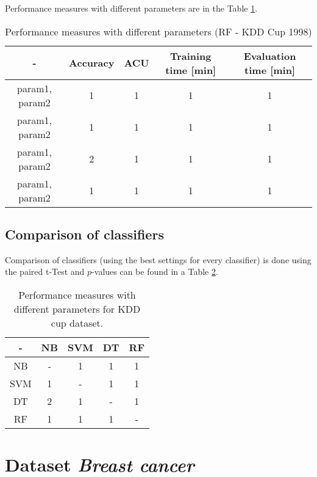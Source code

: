 \documentclass[11pt,a4paper,titlepage]{article}
\begin{document}
  Performance measures with different parameters are in the Table \ref{table:RFKDD}.
  
  \begin{table}
  \centering
  \begin{tabular}{| c | c | c | c | c |}
    \hline
     		-	   & Accuracy & 	ACU 	& Training time [min] & Evaluation time [min] \\ \hline
    param1, param2 &  1 	  &     1		& 		1			  & 		1 		\\ \hline
    param1, param2 & 	1	  & 	1 		& 		1			  &			1 		\\ \hline
    param1, param2 & 	2	  & 	1		& 		1			  &			1		\\ \hline
    param1, param2 &  1       & 	1		& 		1			  &			1			\\
    \hline
  \end{tabular}
  \caption{Performance measures with different parameters (RF - KDD Cup 1998)}
  \label{table:RFKDD}
  \end{table}
  

\subsection{Comparison of classifiers}
Comparison of classifiers (using the best settings for every classifier) is done using the paired t-Test and $p$-values can be found in a Table \ref{table:comparisonKDD}.


  \begin{table}
  \centering
  \begin{tabular}{| c | c | c | c | c |}
    \hline
     		-	   & NB 	  & 	SVM 	& DT		 & RF \\ \hline
    NB 			   &  - 	  &     1		& 		1	 & 	1 		\\ \hline
    SVM 		   & 	1	  & 	- 		& 		1	 &	1 		\\ \hline
    DT 			   & 	2	  & 	1		& 		-	 &	1		\\ \hline
    RF 			   &  1       & 	1		& 		1	 &	-			\\
    \hline
  \end{tabular}
  \caption{Performance measures with different parameters for KDD cup dataset.}
  \label{table:comparisonKDD}
  \end{table}




\section{Dataset \textit{Breast cancer}}
\end{document}
